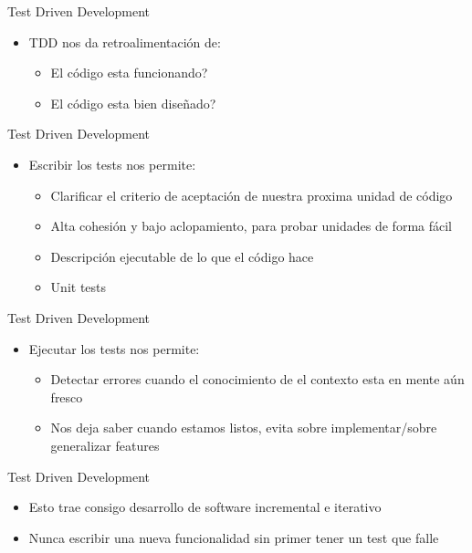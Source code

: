 \begin{frame}{Test Driven Development} 
    \begin{itemize}
        \item TDD nos da retroalimentación de:
        \begin{itemize}
            \item El código esta funcionando?
            \item El código esta bien diseñado?
        \end{itemize}
    \end{itemize}
\end{frame}

\begin{frame}{Test Driven Development} 
    \begin{itemize}
        \item Escribir los tests nos permite:
        \begin{itemize}
            \item Clarificar el criterio de aceptación de nuestra proxima unidad de código
            \item Alta cohesión y bajo aclopamiento, para probar unidades de forma fácil
            \item Descripción ejecutable de lo que el código hace
            \item Unit tests
        \end{itemize}
    \end{itemize}
\end{frame}

\begin{frame}{Test Driven Development} 
    \begin{itemize}
        \item Ejecutar los tests nos permite:
        \begin{itemize}
            \item Detectar errores cuando el conocimiento de el contexto esta en mente aún fresco
            \item Nos deja saber cuando estamos listos, evita sobre implementar/sobre generalizar features
        \end{itemize}
    \end{itemize}
\end{frame}

\begin{frame}{Test Driven Development} 
    \begin{itemize}
        \item Esto trae consigo desarrollo de software incremental e iterativo
    \end{itemize}
    \begin{itemize}
        \item Nunca escribir una nueva funcionalidad sin primer tener un test que falle
    \end{itemize}
\end{frame}


